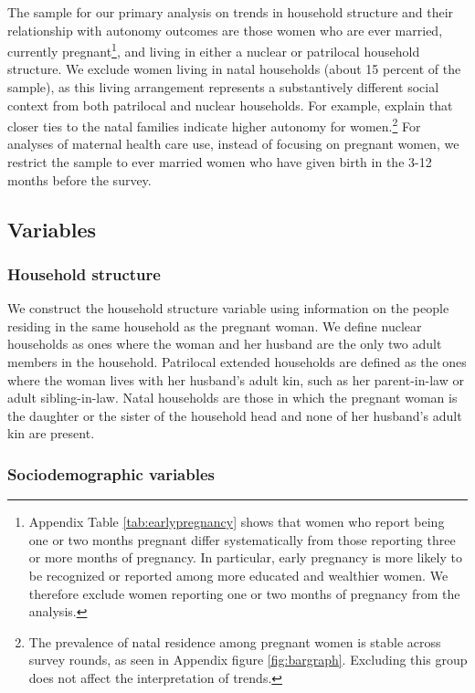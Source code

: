\documentclass[12pt]{article}
\begin{document}
The sample for our primary analysis on trends in household structure and their relationship with autonomy outcomes are those women who are ever married, currently pregnant\footnote{Appendix Table \ref{tab:earlypregnancy} shows that women who report being one or two months pregnant differ systematically from those reporting three or more months of pregnancy. In particular, early pregnancy is more likely to be recognized or reported among more educated and wealthier women. We therefore exclude women reporting one or two months of pregnancy from the analysis.}, and living in either a nuclear or patrilocal household structure. We exclude women living in natal households (about 15 percent of the sample), as this living arrangement represents a substantively different social context from both patrilocal and nuclear households. For example, \cite{dyson1983kinship} explain that closer ties to the natal families indicate higher autonomy for women.\footnote{The prevalence of natal residence among pregnant women is stable across survey rounds, as seen in Appendix figure \ref{fig:bargraph}.  Excluding this group does not affect the interpretation of trends.} For analyses of maternal health care use, instead of focusing on pregnant women, we restrict the sample to ever married women who have given birth in the 3-12 months before the survey.

\subsection{Variables}

\subsubsection{Household structure}
We construct the household structure variable using information on the people residing in the same household as the pregnant woman. We define nuclear households as ones where the woman and her husband are the only two adult members in the household. Patrilocal extended households are defined as the ones where the woman lives with her husband’s adult kin, such as her parent-in-law or adult sibling-in-law. Natal households are those in which the pregnant woman is the daughter or the sister of the household head and none of her husband’s adult kin are present. 

\subsubsection{Sociodemographic variables}  
\end{document}
